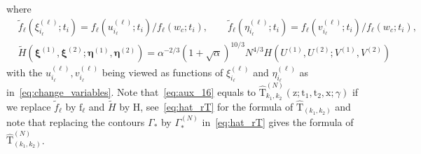 \documentclass{article}
\numberwithin{equation}{section}
\begin{document}
where
\begin{equation}
	\label{eq:aux_28}
	\begin{split}
	&\tilde f_\ell (\xi_{i_\ell}^{(\ell)};t_i) = f_\ell (u_{i_\ell}^{(\ell)};t_i)/f_\ell(w_c;t_i), \qquad
	\tilde f_\ell (\eta_{i_\ell}^{(\ell)};t_i) = f_\ell (v_{i_\ell}^{(\ell)};t_i)/f_\ell(w_c;t_i),\\
	&\tilde {H}(\boldsymbol{\xi}^{(1)},\boldsymbol{\xi}^{(2)};
	\boldsymbol{\eta}^{(1)},\boldsymbol{\eta}^{(2)})=\alpha^{-2/3}(1+\sqrt{\alpha})^{10/3}N^{4/3}H(U^{(1)},U^{(2)};V^{(1)},V^{(2)})
	\end{split}
\end{equation}
with the $u_{i_\ell}^{(\ell)}, v_{i_\ell}^{(\ell)}$ being viewed as functions of $\xi_{i_\ell}^{(\ell)}$ and $\eta_{i_\ell}^{(\ell)}$ as in~\eqref{eq:change_variables}. Note that~\eqref{eq:aux_16} equals to $\mathrm{\hat T}_{k_1,k_2}^{(N)}(\mathrm{z};\mathrm{t}_1,\mathrm{t}_2,\mathrm{x};\gamma)$ if we replace $\tilde f_\ell$ by $\mathrm{f_\ell}$ and $\tilde H$ by $\mathrm{H}$, see~\eqref{eq:hat_rT} for the formula of $\mathrm{\hat T}_{(k_1,k_2)}$ and note that replacing the contours $\Gamma_*$ by $\Gamma_*^{(N)}$ in~\eqref{eq:hat_rT} gives the formula of $\mathrm{\hat T}_{(k_1,k_2)}^{(N)}$.
\end{document}
